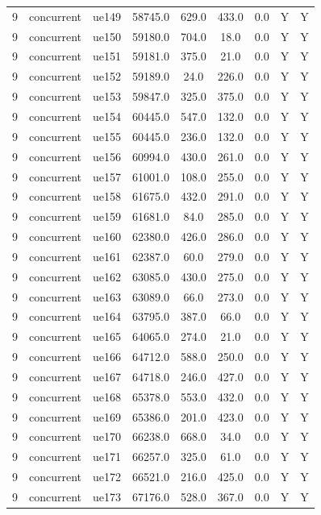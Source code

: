 \begin{table}[ht]
\begin{tabular}{|c|c|c|c|c|c|c|c|c|}
9 & concurrent & ue149 & 58745.0 & 629.0 & 433.0 & 0.0 & Y & Y \\
9 & concurrent & ue150 & 59180.0 & 704.0 & 18.0 & 0.0 & Y & Y \\
9 & concurrent & ue151 & 59181.0 & 375.0 & 21.0 & 0.0 & Y & Y \\
9 & concurrent & ue152 & 59189.0 & 24.0 & 226.0 & 0.0 & Y & Y \\
9 & concurrent & ue153 & 59847.0 & 325.0 & 375.0 & 0.0 & Y & Y \\
9 & concurrent & ue154 & 60445.0 & 547.0 & 132.0 & 0.0 & Y & Y \\
9 & concurrent & ue155 & 60445.0 & 236.0 & 132.0 & 0.0 & Y & Y \\
9 & concurrent & ue156 & 60994.0 & 430.0 & 261.0 & 0.0 & Y & Y \\
9 & concurrent & ue157 & 61001.0 & 108.0 & 255.0 & 0.0 & Y & Y \\
9 & concurrent & ue158 & 61675.0 & 432.0 & 291.0 & 0.0 & Y & Y \\
9 & concurrent & ue159 & 61681.0 & 84.0 & 285.0 & 0.0 & Y & Y \\
9 & concurrent & ue160 & 62380.0 & 426.0 & 286.0 & 0.0 & Y & Y \\
9 & concurrent & ue161 & 62387.0 & 60.0 & 279.0 & 0.0 & Y & Y \\
9 & concurrent & ue162 & 63085.0 & 430.0 & 275.0 & 0.0 & Y & Y \\
9 & concurrent & ue163 & 63089.0 & 66.0 & 273.0 & 0.0 & Y & Y \\
9 & concurrent & ue164 & 63795.0 & 387.0 & 66.0 & 0.0 & Y & Y \\
9 & concurrent & ue165 & 64065.0 & 274.0 & 21.0 & 0.0 & Y & Y \\
9 & concurrent & ue166 & 64712.0 & 588.0 & 250.0 & 0.0 & Y & Y \\
9 & concurrent & ue167 & 64718.0 & 246.0 & 427.0 & 0.0 & Y & Y \\
9 & concurrent & ue168 & 65378.0 & 553.0 & 432.0 & 0.0 & Y & Y \\
9 & concurrent & ue169 & 65386.0 & 201.0 & 423.0 & 0.0 & Y & Y \\
9 & concurrent & ue170 & 66238.0 & 668.0 & 34.0 & 0.0 & Y & Y \\
9 & concurrent & ue171 & 66257.0 & 325.0 & 61.0 & 0.0 & Y & Y \\
9 & concurrent & ue172 & 66521.0 & 216.0 & 425.0 & 0.0 & Y & Y \\
9 & concurrent & ue173 & 67176.0 & 528.0 & 367.0 & 0.0 & Y & Y \\

\end{tabular}
\end{table}

